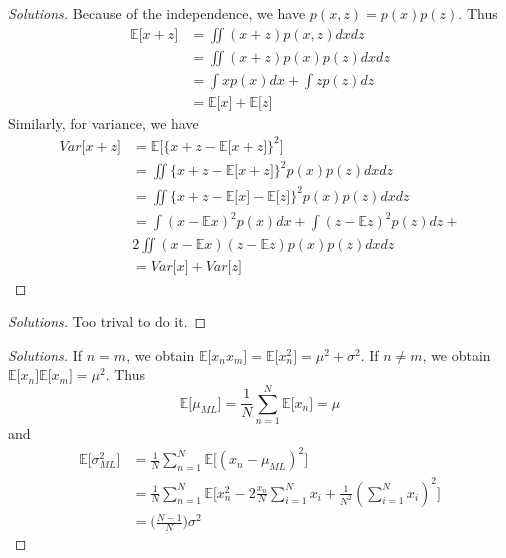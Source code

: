 \documentclass[12pt]{article}
\newcommand{\E}{\mathbb{E}}
\newenvironment{exercise}[2][Ex]{\begin{trivlist}
\item[\hskip \labelsep {\bfseries #1}\hskip \labelsep {\bfseries #2.}]}{\end{trivlist}}
\begin{document}
\begin{exercise}{1.10(*)}
    \begin{proof}[Solutions]
        Because of the independence, we have $p(x,z)=p(x)p(z)$. Thus
        \begin{align*}
            \E\lbrack x+z\rbrack&=\iint(x+z)p(x,z)dxdz\\
            &=\iint(x+z)p(x)p(z)dxdz\\
            &=\int xp(x)dx+\int zp(z)dz\\
            &=\E\lbrack x\rbrack+\E\lbrack z\rbrack
        \end{align*}
        Similarly, for variance, we have
        \begin{align*}
            Var\lbrack x+z\rbrack&=\E\lbrack \{x+z-\E\lbrack x+z\rbrack\}^2\rbrack\\
            &=\iint\{x+z-\E\lbrack x+z\rbrack\}^2p(x)p(z)dxdz\\
            &=\iint\{x+z-\E\lbrack x\rbrack-\E\lbrack z\rbrack\}^2p(x)p(z)dxdz\\
            &=\int(x-\E x)^2p(x)dx+\int(z-\E z)^2p(z)dz+\\
            &2\iint(x-\E x)(z-\E z)p(x)p(z)dxdz\\
            &=Var\lbrack x\rbrack+Var\lbrack z\rbrack
        \end{align*}
    \end{proof}
\end{exercise}
\begin{exercise}{1.11(*)}
    \begin{proof}[Solutions]
        Too trival to do it.
    \end{proof}
\end{exercise}
\begin{exercise}{1.12(**)}
    \begin{proof}[Solutions]
        If $n=m$, we obtain $\E\lbrack x_nx_m\rbrack=\E\lbrack x_n^2\rbrack=\mu^2+\sigma^2$.
        If $n\neq m$, we obtain $\E\lbrack x_n\rbrack\E\lbrack x_m\rbrack=\mu^2$.
        Thus
        \begin{equation}
            \E\lbrack \mu_{ML}\rbrack=\frac{1}{N}\sum_{n=1}^{N}\E\lbrack x_n\rbrack=\mu
        \end{equation}
        and
        \begin{align}
            \E\lbrack \sigma^2_{ML}\rbrack&=\frac{1}{N}\sum_{n=1}^N\E\lbrack(x_n-\mu_{ML})^2
            \rbrack\nonumber\\
            &=\frac{1}{N}\sum_{n=1}^N\E\lbrack x_n^2-2\frac{x_n}{N}\sum_{i=1}^{N}x_i+
            \frac{1}{N^2}(\sum_{i=1}^Nx_i)^2\rbrack\nonumber\\
            &=\Big(\frac{N-1}{N}\Big)\sigma^2
        \end{align}
    \end{proof}
\end{exercise}
\end{document}

